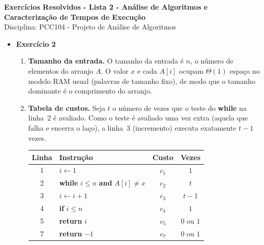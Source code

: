 \documentclass[9pt,a4paper]{extarticle}
\begin{document}
\begin{center}
  \Large \textbf{Exercícios Resolvidos - Lista 2 - Análise de Algoritmos e Caracterização de Tempos de Execução} \\[4pt]
  \normalsize Disciplina: PCC104 - Projeto de Análise de Algoritmos
\end{center}



\begin{itemize}
    \item \textbf{Exercício 2}


\begin{enumerate}[label=(\alph*)]
    \item \textbf{Tamanho da entrada.} O tamanho da entrada é $n$, o número de elementos do arranjo $A$. O valor $x$ e cada $A[i]$ ocupam $\Theta(1)$ espaço no modelo RAM usual (palavras de tamanho fixo), de modo que o tamanho dominante é o comprimento do arranjo.

    \item \textbf{Tabela de custos.} Seja $t$ o número de vezes que o teste do \textbf{while} na linha~2 é avaliado. Como o teste é avaliado uma vez extra (aquela que falha e encerra o laço), a linha~3 (incremento) executa exatamente $t-1$ vezes.

    \begin{center}
    \renewcommand{\arraystretch}{1.15}
    \begin{tabular}{@{}clcc@{}}
        \toprule
        \textbf{Linha} & \textbf{Instrução} & \textbf{Custo} & \textbf{Vezes} \\
        \midrule
        1 & $i \gets 1$                              & $c_1$ & $1$    \\
        2 & \textbf{while} $i \leq n$ \textbf{and} $A[i]\neq x$ & $c_2$ & $t$    \\
        3 & \quad $i \gets i+1$                      & $c_3$ & $t-1$  \\
        4 & \textbf{if} $i \leq n$                    & $c_4$ & $1$    \\
        5 & \quad \textbf{return} $i$                 & $c_5$ & $0$ ou $1$ \\
        7 & \quad \textbf{return} $-1$                & $c_7$ & $0$ ou $1$ \\
        \bottomrule
    \end{tabular}
    \end{center}


\end{enumerate}
\end{itemize}
\end{document}
